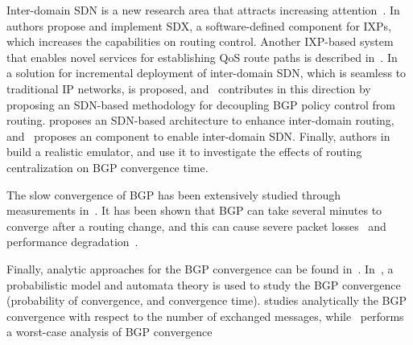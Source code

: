Inter-domain SDN is a new research area that attracts increasing attention~\cite{Gupta-SDX-CCR-2014, Kotronis-CXP-SOSR-2016,Lin-Seamless-Internetworking-Demo-Sigcomm-2013,Thai-Decoupling-BGP-Conext-2012,Rothenberg-Revisiting-RCP-HotSDN-2012,Bennesby-Innovating-IDrouting-AINA-2014,Kotronis-Routing-Centralization-ComNets-2015}. In~\cite{Gupta-SDX-CCR-2014} authors propose and implement SDX, a software-defined component for IXPs, which increases the capabilities on routing control. Another IXP-based system that enables novel services for establishing QoS route paths is described in~\cite{Kotronis-CXP-SOSR-2016}. In~\cite{Lin-Seamless-Internetworking-Demo-Sigcomm-2013} a solution for incremental deployment of inter-domain SDN, which is seamless to traditional IP networks, is proposed, and~\cite{Thai-Decoupling-BGP-Conext-2012} contributes in this direction by proposing an SDN-based methodology for decoupling BGP policy control from routing. \cite{Rothenberg-Revisiting-RCP-HotSDN-2012} proposes an SDN-based architecture to enhance inter-domain routing, and~\cite{Bennesby-Innovating-IDrouting-AINA-2014} proposes an component to enable inter-domain SDN. Finally, authors in~\cite{Kotronis-Routing-Centralization-ComNets-2015} build a realistic emulator, and use it to investigate the effects of routing centralization on BGP convergence time.  



The slow convergence of BGP has been extensively studied through measurements in~\cite{Labozitz-Delayed-convergence-CCR-2000,Kushman-Can-Hear-CCR-2007,Oliveira-Quantifying-Path-Exploration-ToN-2009}. It has been shown that BGP can take several minutes to converge after a routing change, and this can cause severe packet losses~\cite{Labozitz-Delayed-convergence-CCR-2000} and performance degradation~\cite{Kushman-Can-Hear-CCR-2007}. 

Finally, analytic approaches for the BGP convergence can be found in~\cite{convergence-properties-BGP_ComNets-2011,Labozitz-Delayed-convergence-CCR-2000,stability-inter-domain-Infocom-2009}. In~\cite{convergence-properties-BGP_ComNets-2011}, a probabilistic model and automata theory is used to study the BGP convergence (probability of convergence, and convergence time). \cite{Labozitz-Delayed-convergence-CCR-2000} studies analytically the BGP convergence with respect to the number of exchanged messages, while~\cite{stability-inter-domain-Infocom-2009} performs a worst-case analysis of BGP convergence 


